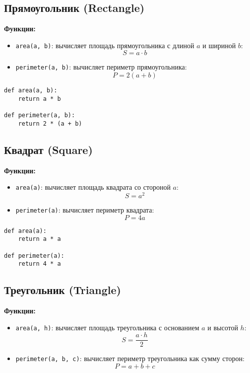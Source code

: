 \documentclass[a4paper,12pt]{article}
\begin{document}
\newpage

\subsection*{Прямоугольник (Rectangle)}
\textbf{Функции:}
\begin{itemize}
    \item \texttt{area(a, b)}: вычисляет площадь прямоугольника с длиной \( a \) и шириной \( b \):  
    \[
    S = a \cdot b
    \]
    \item \texttt{perimeter(a, b)}: вычисляет периметр прямоугольника:  
    \[
    P = 2(a + b)
    \]
\end{itemize}

\begin{lstlisting}[caption={Код для вычисления площади и периметра прямоугольника}]
def area(a, b):
    return a * b

def perimeter(a, b):
    return 2 * (a + b)
\end{lstlisting}

\newpage

\subsection*{Квадрат (Square)}
\textbf{Функции:}
\begin{itemize}
    \item \texttt{area(a)}: вычисляет площадь квадрата со стороной \( a \):  
    \[
    S = a^2
    \]
    \item \texttt{perimeter(a)}: вычисляет периметр квадрата:  
    \[
    P = 4a
    \]
\end{itemize}

\begin{lstlisting}[caption={Код для вычисления площади и периметра квадрата}]
def area(a):
    return a * a

def perimeter(a):
    return 4 * a
\end{lstlisting}

\newpage

\subsection*{Треугольник (Triangle)}
\textbf{Функции:}
\begin{itemize}
    \item \texttt{area(a, h)}: вычисляет площадь треугольника с основанием \( a \) и высотой \( h \):  
    \[
    S = \frac{a \cdot h}{2}
    \]
    \item \texttt{perimeter(a, b, c)}: вычисляет периметр треугольника как сумму сторон:  
    \[
    P = a + b + c
    \]
\end{itemize}
\end{document}
